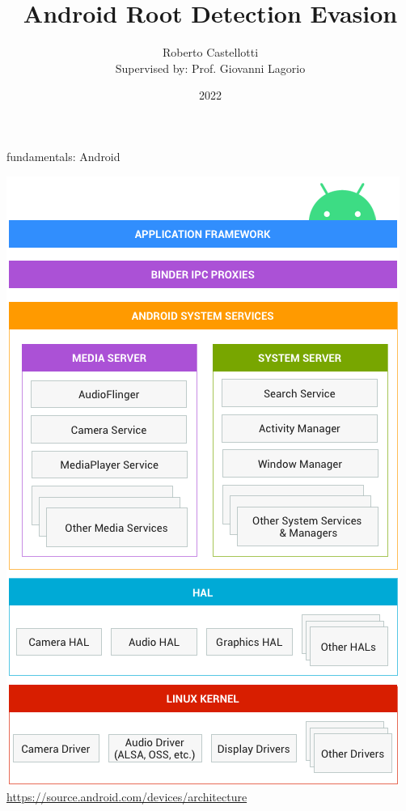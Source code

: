 \documentclass{beamer}
\title{Android Root Detection Evasion}
\author[Roberto Castellotti]{Roberto Castellotti \\ {\small Supervised by: Prof. Giovanni Lagorio}}
\institute{Università di Genova}
\date{2022}
\begin{document}
\frame{\titlepage}

\begin{frame}{fundamentals: Android}

    \centering \includegraphics[scale=0.25]{android.png}
    \href{https://source.android.com/devices/architecture}{https://source.android.com/devices/architecture}

\end{frame}
\end{document}
